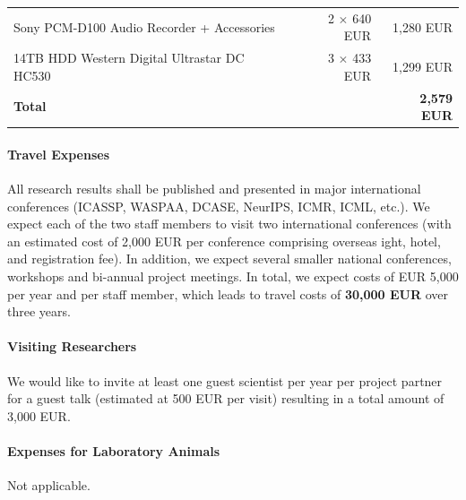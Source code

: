 \documentclass[11pt]{article}
\begin{document}
\begin{table}[h!]
\centering
\begin{tabular}{lrr}
 Sony PCM-D100 Audio Recorder + Accessories
 & 2 $\times$ 640 EUR & 1,280 EUR  \\
 14TB HDD Western Digital Ultrastar DC HC530 & 3 $\times$ 433 EUR & 1,299 EUR  \\
 \hline
 \textbf{Total} &  &   \textbf{2,579 EUR}  \\
\end{tabular}
\end{table}



\paragraph{Travel Expenses}

All research results shall be published and presented in major international conferences (ICASSP, WASPAA, DCASE, NeurIPS, ICMR, ICML, etc.).
We expect each of the two staff members to visit two international conferences (with an estimated
cost of 2,000 EUR per conference comprising overseas 
ight, hotel, and registration fee). In addition, we expect  several smaller national conferences, workshops and bi-annual project meetings. In total, we expect costs of EUR 5,000 per year and per staff member, which leads to travel costs of \textbf{30,000 EUR} over three years.

\paragraph{Visiting Researchers}
We would like to invite at least one guest scientist per year per project partner for a guest talk (estimated at 500 EUR per visit) resulting in a total amount of 
3,000 EUR.

\paragraph{Expenses for Laboratory Animals}
Not applicable. 
\end{document}
